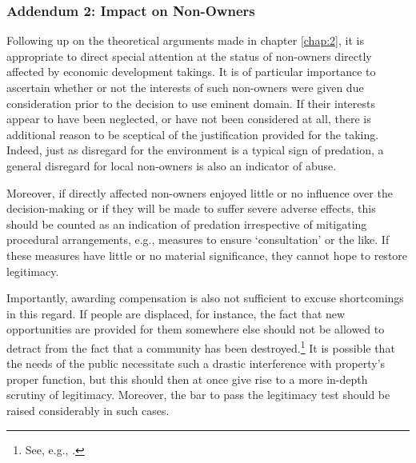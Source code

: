 \subsubsection*{Addendum 2: Impact on Non-Owners}

Following up on the theoretical arguments made in chapter \ref{chap:2}, it is appropriate to direct special attention at the status of non-owners directly affected by economic development takings. It is of particular importance to ascertain whether or not the interests of such non-owners were given due consideration prior to the decision to use eminent domain. If their interests appear to have been neglected, or have not been considered at all, there is additional reason to be sceptical of the justification provided for the taking. Indeed, just as disregard for the environment is a typical sign of predation, a general disregard for local non-owners is also an indicator of abuse.


Moreover, if directly affected non-owners enjoyed little or no influence over the decision-making or if they will be made to suffer severe adverse effects, this should be counted as an indication of predation irrespective of mitigating procedural arrangements, e.g., measures to ensure `consultation' or the like. If these measures have little or no material significance, they cannot hope to restore legitimacy.

Importantly, awarding compensation is also not sufficient to excuse shortcomings in this regard. If people are displaced, for instance, the fact that new opportunities are provided for them somewhere else should not be allowed to detract from the fact that a community has been destroyed.\footnote{See, e.g., \cite{cullet01}.} It is possible that the needs of the public necessitate such a drastic interference with property's proper function, but this should then at once give rise to a more in-depth scrutiny of legitimacy. Moreover, the bar to pass the legitimacy test should be raised considerably in such cases.

